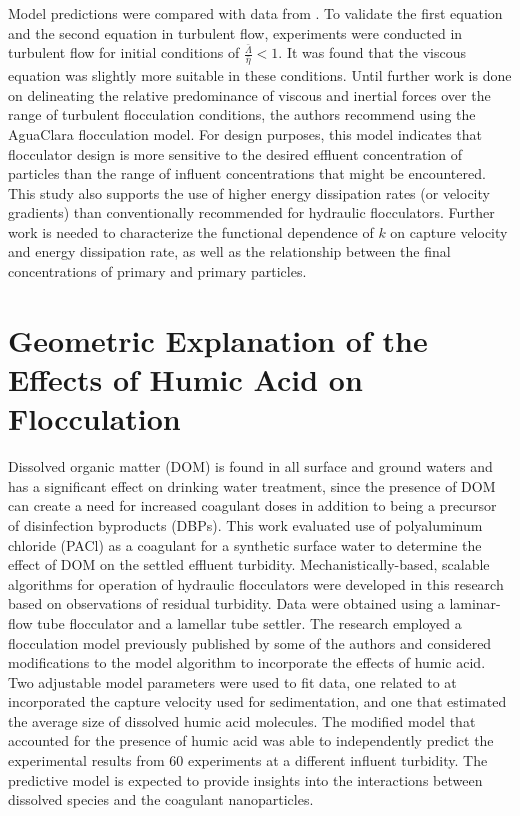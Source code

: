 \documentclass[letterpaper,10pt,english]{sphinxmanual}
\begin{document}
Model predictions were compared with data from \label{\detokenize{Flocculation/Floc_Model:id28}}{\hyperref[\detokenize{Flocculation/Floc_Model:floc-model-swetland-flocculation-sedimentation-2014}]{\sphinxcrossref{{[}SWSL14{]}}}}. To validate the first equation and the second equation in turbulent flow, experiments were conducted in turbulent flow for initial conditions of \(\frac{\bar \Lambda}{\bar{\eta}}<1\). It was found that the viscous equation was slightly more suitable in these conditions. Until further work is done on delineating the relative predominance of viscous and inertial forces over the range of turbulent flocculation conditions, the authors recommend using the AguaClara flocculation model. For design purposes, this model indicates that flocculator design is more sensitive to the desired effluent concentration of particles than the range of influent concentrations that might be encountered. This study also supports the use of higher energy dissipation rates (or velocity gradients) than conventionally recommended for hydraulic flocculators. Further work is needed to characterize the functional dependence of \(k\) on capture velocity and energy dissipation rate, as well as the relationship between the final concentrations of primary and primary
particles.


\section{Geometric Explanation of the Effects of Humic Acid on Flocculation}
\label{\detokenize{Flocculation/Floc_Model:geometric-explanation-of-the-effects-of-humic-acid-on-flocculation}}
Dissolved organic matter (DOM) is found in all surface and ground waters and has a significant effect on drinking water treatment, since the presence of DOM can create a need for increased coagulant doses in addition to being a precursor of disinfection byproducts (DBPs). This work evaluated use of polyaluminum chloride (PACl) as a coagulant for a synthetic surface water to determine the effect of DOM on the settled effluent turbidity. Mechanistically-based, scalable algorithms for operation of hydraulic flocculators were developed in this research based on observations of residual turbidity. Data were obtained using a laminar-flow tube flocculator and a lamellar tube settler. The research employed a flocculation model previously published by some of the authors and considered modifications to the model algorithm to incorporate the effects of humic acid. Two adjustable model parameters were used to fit data, one related to at incorporated the capture velocity used for sedimentation, and one that estimated the average size of dissolved humic acid molecules. The modified model that accounted for the presence of humic acid was able to independently predict the experimental results from 60 experiments at a different influent turbidity. The predictive model is expected to provide insights into the interactions between dissolved species and the coagulant nanoparticles.
\end{document}
